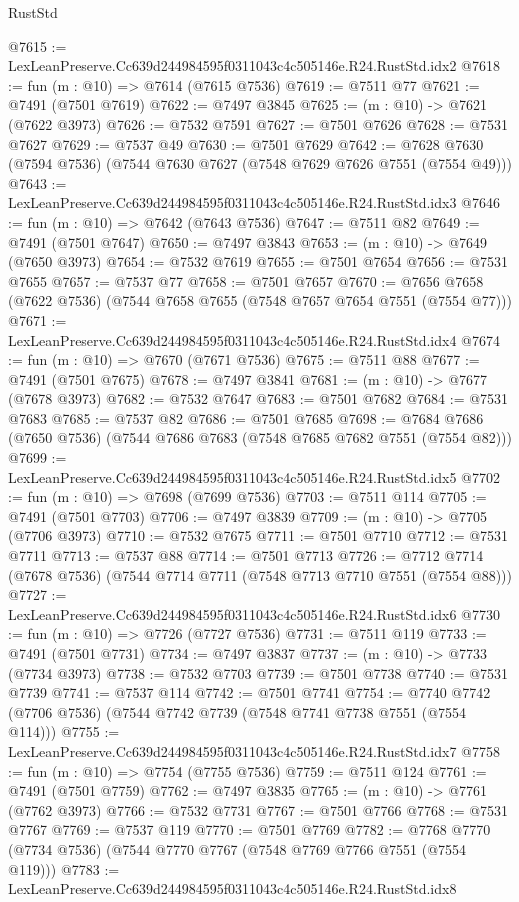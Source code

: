 \begin{lexlean}{RustStd}
\begin{coremodule}
@7615 := LexLeanPreserve.Cc639d244984595f0311043c4c505146e.R24.RustStd.idx2
@7618 := fun (m : @10) => @7614 (@7615 @7536)
@7619 := @7511 @77
@7621 := @7491 (@7501 @7619)
@7622 := @7497 @3845
@7625 := (m : @10) -> @7621 (@7622 @3973)
@7626 := @7532 @7591
@7627 := @7501 @7626
@7628 := @7531 @7627
@7629 := @7537 @49
@7630 := @7501 @7629
@7642 := @7628 @7630 (@7594 @7536) (@7544 @7630 @7627 (@7548 @7629 @7626 @7551 (@7554 @49)))
@7643 := LexLeanPreserve.Cc639d244984595f0311043c4c505146e.R24.RustStd.idx3
@7646 := fun (m : @10) => @7642 (@7643 @7536)
@7647 := @7511 @82
@7649 := @7491 (@7501 @7647)
@7650 := @7497 @3843
@7653 := (m : @10) -> @7649 (@7650 @3973)
@7654 := @7532 @7619
@7655 := @7501 @7654
@7656 := @7531 @7655
@7657 := @7537 @77
@7658 := @7501 @7657
@7670 := @7656 @7658 (@7622 @7536) (@7544 @7658 @7655 (@7548 @7657 @7654 @7551 (@7554 @77)))
@7671 := LexLeanPreserve.Cc639d244984595f0311043c4c505146e.R24.RustStd.idx4
@7674 := fun (m : @10) => @7670 (@7671 @7536)
@7675 := @7511 @88
@7677 := @7491 (@7501 @7675)
@7678 := @7497 @3841
@7681 := (m : @10) -> @7677 (@7678 @3973)
@7682 := @7532 @7647
@7683 := @7501 @7682
@7684 := @7531 @7683
@7685 := @7537 @82
@7686 := @7501 @7685
@7698 := @7684 @7686 (@7650 @7536) (@7544 @7686 @7683 (@7548 @7685 @7682 @7551 (@7554 @82)))
@7699 := LexLeanPreserve.Cc639d244984595f0311043c4c505146e.R24.RustStd.idx5
@7702 := fun (m : @10) => @7698 (@7699 @7536)
@7703 := @7511 @114
@7705 := @7491 (@7501 @7703)
@7706 := @7497 @3839
@7709 := (m : @10) -> @7705 (@7706 @3973)
@7710 := @7532 @7675
@7711 := @7501 @7710
@7712 := @7531 @7711
@7713 := @7537 @88
@7714 := @7501 @7713
@7726 := @7712 @7714 (@7678 @7536) (@7544 @7714 @7711 (@7548 @7713 @7710 @7551 (@7554 @88)))
@7727 := LexLeanPreserve.Cc639d244984595f0311043c4c505146e.R24.RustStd.idx6
@7730 := fun (m : @10) => @7726 (@7727 @7536)
@7731 := @7511 @119
@7733 := @7491 (@7501 @7731)
@7734 := @7497 @3837
@7737 := (m : @10) -> @7733 (@7734 @3973)
@7738 := @7532 @7703
@7739 := @7501 @7738
@7740 := @7531 @7739
@7741 := @7537 @114
@7742 := @7501 @7741
@7754 := @7740 @7742 (@7706 @7536) (@7544 @7742 @7739 (@7548 @7741 @7738 @7551 (@7554 @114)))
@7755 := LexLeanPreserve.Cc639d244984595f0311043c4c505146e.R24.RustStd.idx7
@7758 := fun (m : @10) => @7754 (@7755 @7536)
@7759 := @7511 @124
@7761 := @7491 (@7501 @7759)
@7762 := @7497 @3835
@7765 := (m : @10) -> @7761 (@7762 @3973)
@7766 := @7532 @7731
@7767 := @7501 @7766
@7768 := @7531 @7767
@7769 := @7537 @119
@7770 := @7501 @7769
@7782 := @7768 @7770 (@7734 @7536) (@7544 @7770 @7767 (@7548 @7769 @7766 @7551 (@7554 @119)))
@7783 := LexLeanPreserve.Cc639d244984595f0311043c4c505146e.R24.RustStd.idx8

\end{coremodule}
\end{lexlean}
